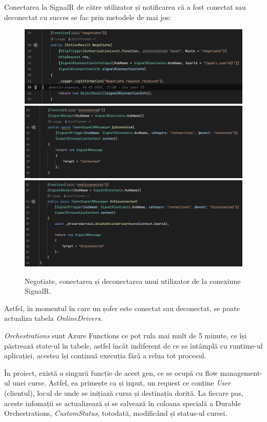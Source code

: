 Conectarea la SignalR de către utilizator și notificarea că a fost conectat sau 
deconectat cu succes se fac prin metodele de mai jos:
\begin{figure}[H]
    \centering
    \includegraphics[width=14cm]{Assets/negotiate.png}
    \includegraphics[width=14cm]{Assets/onconnected.png}
    \includegraphics[width=14cm]{Assets/ondisconnected.png}
    \caption{Negotiate, conectarea și deconectarea unui utilizator de la conexiune SignalR.}
    \label{fig:negotiateConnectDisconnect}
\end{figure}
Astfel, în momentul în care un șofer este conectat sau deconectat, se poate actualiza
tabela \textit{OnlineDrivers}.

\textit{Orchestrations} sunt Azure Functions ce pot rula mai mult de 5 minute, ce își păstrează
state-ul în tabele, astfel încât indiferent de ce se întâmplă cu runtime-ul aplicației,
acestea își continuă execuția fără a relua tot procesul.

În proiect, există o singură funcție de acest gen, ce se ocupă cu flow management-ul unei curse.
Astfel, ea primește ca și input, un request ce conține \textit{User} (clientul), locul de unde se inițiază
cursa și destinația dorită. La fiecare pas, aceste infomații se actualizează și 
se salvează în coloana specială a Durable Orchestrations, \textit{CustomStatus}, totodată, modificând și status-ul
cursei.

